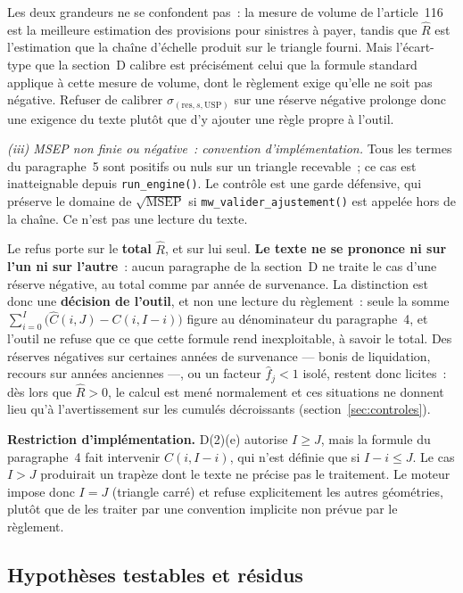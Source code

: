 \documentclass[a4paper,11pt]{article}
\newcommand{\code}[1]{\texttt{\small #1}}
\begin{document}
\noindent
Les deux grandeurs ne se confondent pas~: la mesure de volume de l'article~116
est la meilleure estimation des provisions pour sinistres à payer, tandis que
$\hat R$ est l'estimation que la chaîne d'échelle produit sur le triangle fourni.
Mais l'écart-type que la section~D calibre est précisément celui que la formule
standard applique à cette mesure de volume, dont le règlement exige qu'elle ne
soit pas négative. Refuser de calibrer $\sigma_{(\text{res},s,\mathrm{USP})}$ sur
une réserve négative prolonge donc une exigence du texte plutôt que d'y ajouter
une règle propre à l'outil.

\emph{(iii) MSEP non finie ou négative~: convention d'implémentation.} Tous les
termes du paragraphe~5 sont positifs ou nuls sur un triangle recevable~; ce cas
est inatteignable depuis \code{run\_engine()}. Le contrôle est une garde
défensive, qui préserve le domaine de $\sqrt{\mathrm{MSEP}}$ si
\code{mw\_valider\_ajustement()} est appelée hors de la chaîne. Ce n'est pas une
lecture du texte.

Le refus porte sur le \textbf{total} $\hat R$, et sur lui seul. \textbf{Le texte
ne se prononce ni sur l'un ni sur l'autre}~: aucun paragraphe de la section~D ne
traite le cas d'une réserve négative, au total comme par année de survenance. La
distinction est donc une \textbf{décision de l'outil}, et non une lecture du
règlement~: seule la somme $\sum_{i=0}^{I}\big(\hat C(i,J) - C(i,I-i)\big)$
figure au dénominateur du paragraphe~4, et l'outil ne refuse que ce que cette
formule rend inexploitable, à savoir le total. Des réserves négatives sur
certaines années de survenance --- bonis de liquidation, recours sur années
anciennes ---, ou un facteur $\hat f_j < 1$ isolé, restent donc licites~: dès
lors que $\hat R > 0$, le calcul est mené normalement et ces situations ne
donnent lieu qu'à l'avertissement sur les cumulés décroissants
(section~\ref{sec:controles}).

\begin{encadre}
\textbf{Restriction d'implémentation.} D(2)(e) autorise $I \ge J$, mais
la formule du paragraphe~4 fait intervenir $C(i, I-i)$, qui n'est définie que si
$I - i \le J$. Le cas $I > J$ produirait un trapèze dont le texte ne précise pas
le traitement. Le moteur impose donc $I = J$ (triangle carré) et refuse
explicitement les autres géométries, plutôt que de les traiter par une convention
implicite non prévue par le règlement.
\end{encadre}

\subsection{Hypothèses testables et résidus}
\end{document}
